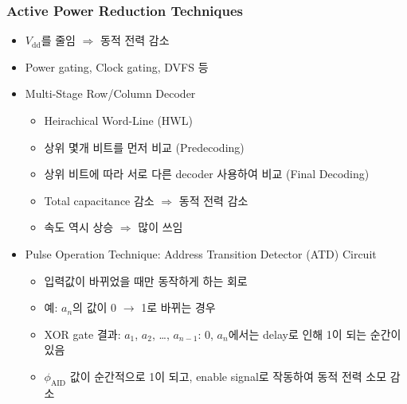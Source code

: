 \subsubsection*{Active Power Reduction Techniques}
\begin{itemize}
    \item $V_{\mathrm{dd}}$를 줄임 $\Rightarrow$ 동적 전력 감소
    \item Power gating, Clock gating, DVFS 등
    \item Multi-Stage Row/Column Decoder
    \begin{itemize}
        \item Heirachical Word-Line (HWL)
        \item 상위 몇개 비트를 먼저 비교 (Predecoding)
        \item 상위 비트에 따라 서로 다른 decoder 사용하여 비교 (Final Decoding)
        \item Total capacitance 감소 $\Rightarrow$ 동적 전력 감소
        \item 속도 역시 상승 $\Rightarrow$ 많이 쓰임
    \end{itemize}
    \item Pulse Operation Technique: Address Transition Detector (ATD) Circuit
    \begin{itemize}
        \item 입력값이 바뀌었을 때만 동작하게 하는 회로
        \item 예: $a_n$의 값이 0 $\rightarrow$ 1로 바뀌는 경우
        \item XOR gate 결과: $a_1$, $a_2$, \ldots, $a_{n-1}$: 0, $a_n$에서는 delay로 인해 1이 되는 순간이 있음
        \item $\phi_{\mathrm{AID}}$ 값이 순간적으로 1이 되고, enable signal로 작동하여 동적 전력 소모 감소
    \end{itemize}
    \begin{figures}
    \end{figures}
\end{itemize}

